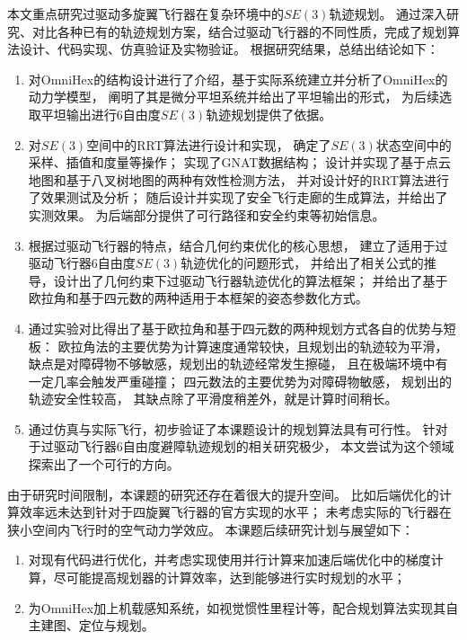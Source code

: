 
\begin{conclusions} 

本文重点研究过驱动多旋翼飞行器在复杂环境中的$SE(3)$轨迹规划。
通过深入研究、对比各种已有的轨迹规划方案，结合过驱动飞行器的不同性质，完成了规划算法设计、代码实现、仿真验证及实物验证。
根据研究结果，总结出结论如下：
\begin{enumerate}
    \renewcommand{\labelenumi}{(\theenumi)}
    \item 对OmniHex的结构设计进行了介绍，基于实际系统建立并分析了OmniHex的动力学模型，
    阐明了其是微分平坦系统并给出了平坦输出的形式，
    为后续选取平坦输出进行6自由度$SE(3)$轨迹规划提供了依据。
    \item 对$SE(3)$空间中的RRT算法进行设计和实现，
    确定了$SE(3)$状态空间中的采样、插值和度量等操作；
    实现了GNAT数据结构；
    设计并实现了基于点云地图和基于八叉树地图的两种有效性检测方法，
    并对设计好的RRT算法进行了效果测试及分析；
    随后设计并实现了安全飞行走廊的生成算法，并给出了实测效果。
    为后端部分提供了可行路径和安全约束等初始信息。
    \item 根据过驱动飞行器的特点，结合几何约束优化的核心思想，
    建立了适用于过驱动飞行器6自由度$SE(3)$轨迹优化的问题形式，
    并给出了相关公式的推导，设计出了几何约束下过驱动飞行器轨迹优化的算法框架；
    并给出了基于欧拉角和基于四元数的两种适用于本框架的姿态参数化方式。
    \item 通过实验对比得出了基于欧拉角和基于四元数的两种规划方式各自的优势与短板：
    欧拉角法的主要优势为计算速度通常较快，且规划出的轨迹较为平滑，
    缺点是对障碍物不够敏感，规划出的轨迹经常发生擦碰，
    且在极端环境中有一定几率会触发严重碰撞；
    四元数法的主要优势为对障碍物敏感，
    规划出的轨迹安全性较高，
    其缺点除了平滑度稍差外，就是计算时间稍长。
    \item 通过仿真与实际飞行，初步验证了本课题设计的规划算法具有可行性。
    针对于过驱动飞行器6自由度避障轨迹规划的相关研究极少，
本文尝试为这个领域探索出了一个可行的方向。
\end{enumerate}

由于研究时间限制，本课题的研究还存在着很大的提升空间。
比如后端优化的计算效率远未达到针对于四旋翼飞行器的官方实现的水平；
未考虑实际的飞行器在狭小空间内飞行时的空气动力学效应。
本课题后续研究计划与展望如下：
\begin{enumerate}
    \renewcommand{\labelenumi}{(\theenumi)}
    \item 对现有代码进行优化，并考虑实现使用并行计算来加速后端优化中的梯度计算，尽可能提高规划器的计算效率，达到能够进行实时规划的水平；
    \item 为OmniHex加上机载感知系统，如视觉惯性里程计等，配合规划算法实现其自主建图、定位与规划。
\end{enumerate}

\end{conclusions}
